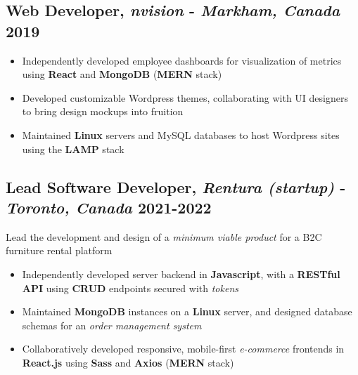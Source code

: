 \documentclass[9pt]{article}
\begin{document}
\subsection{Web Developer, \textit{nvision} - \normalsize\textit{Markham, Canada} \hfill \normalsize\textnormal{2019}}
\begin{itemize}
  \item Independently developed employee dashboards for visualization of metrics using \textbf{React} and \textbf{MongoDB} (\textbf{MERN} stack)
  \item Developed customizable Wordpress themes, collaborating with UI designers to bring design mockups into fruition
  \item Maintained \textbf{Linux} servers and MySQL databases to host Wordpress sites using the \textbf{LAMP} stack
\end{itemize}

\subsection{Lead Software Developer, \textit{Rentura (startup)} - \normalsize\textit{Toronto, Canada} \hfill \normalsize\textnormal{2021-2022}}
Lead the development and design of a \textit{minimum viable product} for a B2C furniture rental platform
\vspace{-0.5em}
\begin{itemize}
  \item Independently developed server backend in \textbf{Javascript}, with a \textbf{RESTful API} using \textbf{CRUD} endpoints secured with \textit{tokens}
  \item Maintained \textbf{MongoDB} instances on a \textbf{Linux} server, and designed database schemas for an \textit{order management system}
  \item Collaboratively developed responsive, mobile-first \textit{e-commerce} frontends in \textbf{React.js} using \textbf{Sass} and \textbf{Axios} (\textbf{MERN} stack)
\end{itemize}
\end{document}
